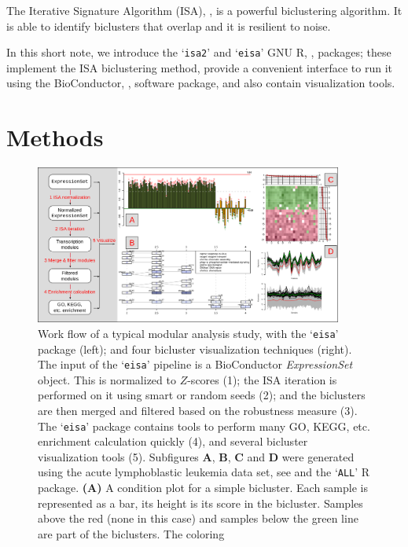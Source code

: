 \documentclass{bioinfo}
\newcommand{\Rpackage}[1]{`\texttt{#1}'}
\newcommand{\Rclass}[1]{\textsl{#1}}
\newcommand{\subfig}[1]{\textbf{#1}}
\begin{document}

The Iterative Signature Algorithm (ISA), \cite{sa,isa,isamod}, is a 
powerful biclustering algorithm. It is able to identify biclusters
that overlap and it is resilient to noise.

In this short note, we introduce the \Rpackage{isa2} and
\Rpackage{eisa} GNU R, \cite{R}, packages; these implement the ISA
biclustering method, provide a convenient interface to run it using
the BioConductor, \cite{BioC}, software package, and also contain
visualization tools.

\section{Methods}

\begin{figure}
\centering
\includegraphics[width=0.9\textwidth]{isa2workflow3}
\caption{Work flow of a typical modular analysis study, with the
  \Rpackage{eisa} package (left); and four bicluster visualization
  techniques (right). The input of the \Rpackage{eisa} pipeline is a
  BioConductor \Rclass{ExpressionSet} object. This is normalized to
  $Z$-scores (1); the ISA iteration is performed on it using smart or
  random seeds (2); and the biclusters are then merged and filtered
  based on the robustness measure (3). The \Rpackage{eisa} package
  contains tools to perform many GO, KEGG, etc. enrichment calculation
  quickly (4), and several bicluster visualization tools (5).
  Subfigures \subfig{A}, \subfig{B}, \subfig{C} and \subfig{D} were generated
  using the acute lymphoblastic leukemia data set, see
  \cite{chiaretti04} and the \Rpackage{ALL} R package.
  \subfig{(A)} A condition plot for a simple bicluster. Each sample is
  represented as a bar, its height is its score in the bicluster. 
  Samples above the red (none in this case) and samples
  below the green line are part of the biclusters. The coloring
}
\end{figure}
\end{document}
